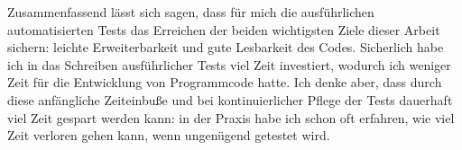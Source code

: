 Zusammenfassend lässt sich sagen, dass für mich die ausführlichen automatisierten Tests das Erreichen der beiden wichtigsten Ziele dieser Arbeit sichern: leichte Erweiterbarkeit und gute Lesbarkeit des Codes. Sicherlich habe ich in das Schreiben ausführlicher Tests viel Zeit investiert, wodurch ich weniger Zeit für die Entwicklung von Programmcode hatte. Ich denke aber, dass durch diese anfängliche Zeiteinbuße und bei kontinuierlicher Pflege der Tests dauerhaft viel Zeit gespart werden kann: in der Praxis habe ich schon oft erfahren, wie viel Zeit verloren gehen kann, wenn ungenügend getestet wird.